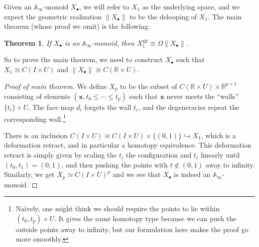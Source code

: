 \documentclass{shortart}
\newtheorem{thm}[lemma]{Theorem}
\theoremstyle{definition}
\newcommand\A{\mathbb{A}}
\newcommand\R{\mathbb{R}}
\newcommand\gp{\mathrm{gp}}
\newcommand\dcirc[1]{\node [fill, circle, inner sep = 0, minimum size = 3] at #1 {};}
\begin{document}
Given an $\A_\infty$-monoid $X_{\bullet}$, we will refer to $X_1$ as the underlying space, and we expect the geometric realization $\|X_\bullet\|$ to be the delooping of $X_1$. The main theorem (whose proof we omit) is the following:
\begin{thm}
  If $X_\bullet$ is an $\A_\infty$-monoid, then $X_1^\gp \cong \Omega \|X_\bullet\|$.\fakeqed
\end{thm}

So to prove the main theorem, we need to construct $X_\bullet$ such that $X_1 \cong C(I \times U)$ and $\|X_\bullet\| \cong C(\R \times U)$.
\begin{proof}[Proof of main theorem]
  We define $X_p$ to be the subset of $C(\R \times U) \times \R^{p + 1}$ consisting of elements $(\mathbf{x}, t_0 \leq \cdots \leq t_p)$ such that $\mathbf{x}$ never meets the ``walls'' $\{t_i\} \times U$. The face map $d_i$ forgets the wall $t_i$,  and the degeneracies repeat the corresponding wall.\footnote{Na\"ively, one might think we should require the points to lie within $(t_0, t_p) \times U$. It gives the same homotopy type because we can push the outside points away to infinity, but our formulation here makes the proof go more smoothly.}

  \begin{center}
  \end{center}

  There is an inclusion $C(I \times U) \cong C(I \times U) \times \{(0, 1)\} \hookrightarrow X_1$, which is a deformation retract, and in particular a homotopy equivalence. This deformation retract is simply given by scaling the $t_i$ the configuration and $t_i$ linearly until $(t_0, t_1) = (0, 1)$, and then pushing the points with $t \not\in (0, 1)$ away to infinity. Similarly, we get $X_p \simeq C(I \times U)^p$ and we see that $X_\bullet$ is indeed an $\A_\infty$-monoid.


\end{proof}
\end{document}
